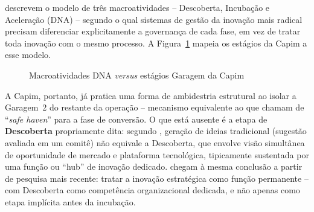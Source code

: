 \textcite{salernogomes2018} descrevem o modelo de três macroatividades -- Descoberta, Incubação e Aceleração (DNA) -- segundo o qual sistemas de gestão da inovação mais radical precisam diferenciar explicitamente a governança de cada fase, em vez de tratar toda inovação com o mesmo processo. A Figura~\ref{fig:funil-dna} mapeia os estágios da Capim a esse modelo.

\begin{figure}[h]
  \caption{Macroatividades DNA \textit{versus} estágios Garagem da Capim}
  \label{fig:funil-dna}
  \centering
\end{figure}

A Capim, portanto, já pratica uma forma de ambidestria estrutural ao isolar a Garagem~2 do restante da operação -- mecanismo equivalente ao que \textcite{hansenbirkinshaw2007} chamam de ``\textit{safe haven}'' para a fase de conversão. O que está ausente é a etapa de \textbf{Descoberta} propriamente dita: segundo \textcite{salernogomes2018}, geração de ideias tradicional (sugestão avaliada em um comitê) não equivale a Descoberta, que envolve visão simultânea de oportunidade de mercado e plataforma tecnológica, tipicamente sustentada por uma função ou ``hub'' de inovação dedicado. \textcite{oconnormeyer2026} chegam à mesma conclusão a partir de pesquisa mais recente: tratar a inovação estratégica como função permanente -- com Descoberta como competência organizacional dedicada, e não apenas como etapa implícita antes da incubação.

